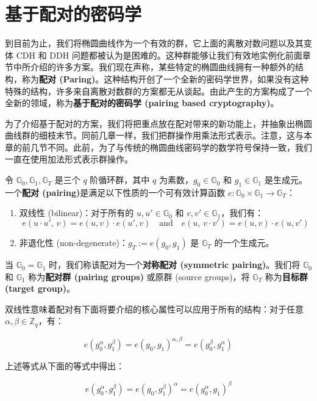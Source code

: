 \section{基于配对的密码学}\label{sec:15-4}

到目前为止，我们将椭圆曲线作为一个有效的群，它上面的离散对数问题以及其变体 CDH 和 DDH 问题都被认为是困难的。这种群能够让我们有效地实例化前面章节中所介绍的许多方案。我们现在声称，某些特定的椭圆曲线拥有一种额外的结构，称为\textbf{配对 (Paring)}。这种结构开创了一个全新的密码学世界，如果没有这种特殊的结构，许多来自离散对数群的方案都无从谈起。由此产生的方案构成了一个全新的领域，称为\textbf{基于配对的密码学 (pairing based cryptography)}。

为了介绍基于配对的方案，我们将把重点放在配对带来的新功能上，并抽象出椭圆曲线群的细枝末节。同前几章一样，我们把群操作用乘法形式表示。注意，这与本章的前几节不同。此前，为了与传统的椭圆曲线密码学的数学符号保持一致，我们一直在使用加法形式表示群操作。

\begin{definition}\label{def:15-2}
令 $\mathbb{G}_0,\mathbb{G}_1,\mathbb{G}_T$ 是三个 $q$ 阶循环群，其中 $q$ 为素数，$g_0\in\mathbb{G}_0$ 和 $g_1\in\mathbb{G}_1$ 是生成元。一个\textbf{配对 (pairing)}是满足以下性质的一个可有效计算函数 $e:\mathbb{G}_0\times\mathbb{G}_1\to\mathbb{G}_T$：
\begin{enumerate}
	\item 双线性 (bilinear)：对于所有的 $u,u'\in\mathbb{G}_0$ 和 $v,v'\in\mathbb{G}_1$，我们有：
	\[
		e(u\cdot u',\,v)=e(u,v)\cdot e(u',v)
		\quad\text{and}\quad
		e(u,\,v\cdot v')=e(u,v)\cdot e(u,v')
	\]
	\item 非退化性 (non-degenerate)：$g_T:=e(g_0,g_1)$ 是 $\mathbb{G}_T$ 的一个生成元。
\end{enumerate}
当 $\mathbb{G}_0=\mathbb{G}_1$ 时，我们称该配对为一个\textbf{对称配对 (symmetric pairing)}。我们将 $\mathbb{G}_0$ 和 $\mathbb{G}_1$ 称为\textbf{配对群 (pairing groups)} 或原群 (source groups)，将 $\mathbb{G}_T$ 称为\textbf{目标群 (target group)}。
\end{definition}

双线性意味着配对有下面将要介绍的核心属性可以应用于所有的结构：对于任意 $\alpha,\beta \in \mathbb{Z}_q$，有：

$$
e(g_0^\alpha,g_1^\beta)=e(g_0,g_1)^{\alpha,\beta}=e(g_0^\beta,g_1^\alpha)
$$

上述等式从下面的等式中得出：

$$
e(g_0^\alpha,g_1^\beta)=e(g_0,g_1^\beta)^{\alpha}=e(g_0^\alpha,g_1)^\beta
$$

